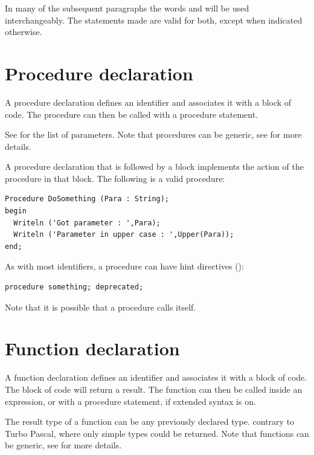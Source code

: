 \begin{remark} In many of the subsequent paragraphs the words 
and  will be used interchangeably. The statements made are
valid for both, except when indicated otherwise.
\end{remark}

\section{Procedure declaration}
A procedure declaration defines an identifier and associates it with a
block of code. The procedure can then be called with a procedure statement.

See  for the list of parameters.
Note that procedures can be generic, see  for more
details.

A procedure declaration that is followed by a block implements the action of
the procedure in that block.
The following is a valid procedure:
\begin{verbatim}
Procedure DoSomething (Para : String);
begin
  Writeln ('Got parameter : ',Para);
  Writeln ('Parameter in upper case : ',Upper(Para));
end;
\end{verbatim}

As with most identifiers, a procedure can have hint directives
():
\begin{verbatim}
procedure something; deprecated;
\end{verbatim}

Note that it is possible that a procedure calls itself.

\section{Function declaration}
A function declaration defines an identifier and associates it with a
block of code. The block of code will return a result.
The function can then be called inside an expression, or with a procedure
statement, if extended syntax is on.

The result type of a function can be any previously declared type.
contrary to Turbo Pascal, where only simple types could be returned.
Note that functions can be generic, see  for more
details.

